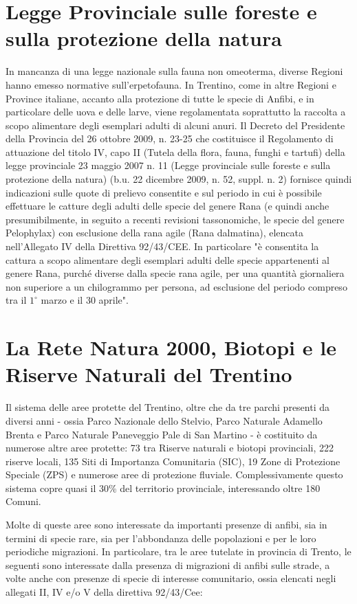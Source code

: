 \documentclass[11pt,a4paper,twoside]{memoir}
\begin{document}
\section{Legge Provinciale sulle foreste e sulla protezione della natura}
\label{sec:norme_provincia}
In mancanza di una legge nazionale sulla fauna non omeoterma, diverse Regioni hanno emesso normative sull'erpetofauna. In Trentino, come in altre Regioni e Province italiane, accanto alla protezione di tutte le specie di Anfibi, e in particolare delle uova e delle larve, viene regolamentata soprattutto la raccolta a scopo alimentare degli esemplari adulti di alcuni anuri. Il Decreto del Presidente della Provincia del 26 ottobre 2009, n. 23-25 che costituisce il Regolamento di attuazione del titolo IV, capo II (Tutela della flora, fauna, funghi e tartufi) della legge provinciale 23 maggio 2007 n. 11 (Legge provinciale sulle foreste e sulla protezione della natura) (b.u. 22 dicembre 2009, n. 52, suppl. n. 2) fornisce quindi indicazioni sulle quote di prelievo consentite e sul periodo in cui è possibile effettuare le catture degli adulti delle specie del genere Rana (e quindi anche presumibilmente, in seguito a recenti revisioni tassonomiche, le specie del genere Pelophylax) con esclusione della rana agile (Rana dalmatina), elencata nell'Allegato IV della Direttiva 92/43/CEE. In particolare "è consentita la cattura a scopo alimentare degli esemplari adulti delle specie appartenenti al genere Rana, purché diverse dalla specie rana agile, per una quantità giornaliera non superiore a un chilogrammo per persona, ad esclusione del periodo compreso tra il $1^{\circ}$ marzo e il 30 aprile". 

\section{La Rete Natura 2000, Biotopi e le Riserve Naturali del Trentino}
\label{sec:norme_rete2000}
Il sistema delle aree protette del Trentino, oltre che da tre parchi presenti da diversi anni - ossia Parco Nazionale dello Stelvio, Parco Naturale Adamello Brenta e Parco Naturale Paneveggio Pale di San Martino - è costituito da numerose altre aree protette: 73 tra Riserve naturali e biotopi provinciali, 222 riserve locali, 135 Siti di Importanza Comunitaria (SIC), 19 Zone di Protezione Speciale (ZPS) e numerose aree di protezione fluviale. Complessivamente questo sistema copre quasi il 30\% del territorio provinciale, interessando oltre 180 Comuni. 

Molte di queste aree sono interessate da importanti presenze di anfibi, sia in termini di specie rare, sia per l'abbondanza delle popolazioni e per le loro periodiche migrazioni. 
In particolare, tra le aree tutelate in provincia di Trento, le seguenti sono interessate dalla presenza di migrazioni di anfibi sulle strade, a volte anche con presenze di specie di interesse comunitario, ossia elencati negli allegati II, IV e/o V della direttiva 92/43/Cee:
\end{document}
